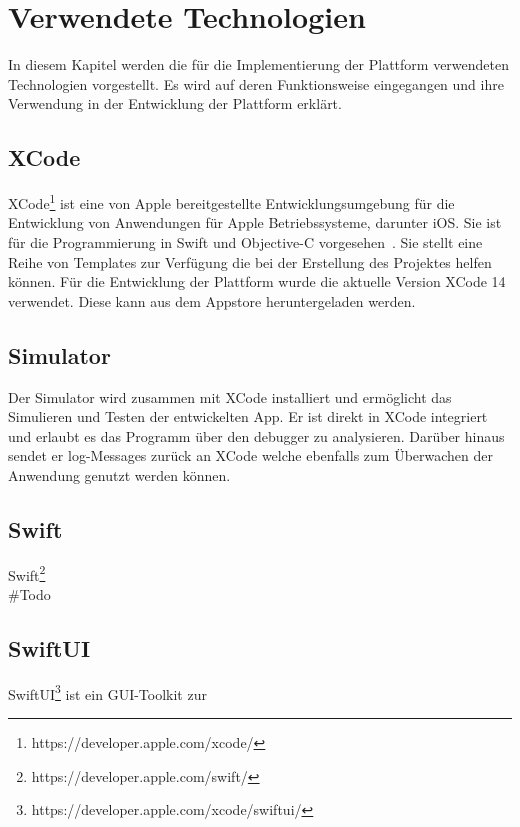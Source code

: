     \chapter{Verwendete Technologien}\label{ch:verwendete-technologien}
    In diesem Kapitel werden die für die Implementierung der Plattform verwendeten Technologien vorgestellt.
    Es wird auf deren Funktionsweise eingegangen und ihre Verwendung in der Entwicklung der Plattform erklärt.


    \section{XCode}\label{sec:xcode}
    XCode\footnote{https://developer.apple.com/xcode/} ist eine von Apple bereitgestellte Entwicklungsumgebung für die Entwicklung von Anwendungen für Apple Betriebssysteme, darunter iOS.
    Sie ist für die Programmierung in Swift und Objective-C vorgesehen~\cite{xcode}.
    Sie stellt eine Reihe von Templates zur Verfügung die bei der Erstellung des Projektes helfen können.
    Für die Entwicklung der Plattform wurde die aktuelle Version XCode 14 verwendet.
    Diese kann aus dem Appstore heruntergeladen werden.

    \section{Simulator}\label{sec:simulator}
    Der Simulator wird zusammen mit XCode installiert und ermöglicht das Simulieren und Testen der entwickelten App.
    Er ist direkt in XCode integriert und erlaubt es das Programm über den debugger zu analysieren.
    Darüber hinaus sendet er log-Messages zurück an XCode welche ebenfalls zum Überwachen der Anwendung genutzt werden können.


    \section{Swift}\label{sec:swift}
    Swift\footnote{https://developer.apple.com/swift/}\\
    \#Todo

    \cite{Goodwill2015}

    \section{SwiftUI}
    SwiftUI\footnote{https://developer.apple.com/xcode/swiftui/} ist ein GUI-Toolkit zur\\

